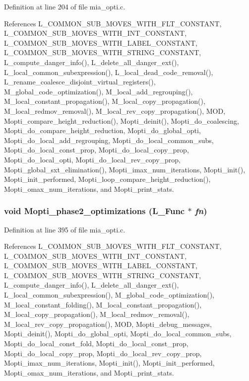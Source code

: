 Definition at line 204 of file mia\_\-opti.c.

References L\_\-COMMON\_\-SUB\_\-MOVES\_\-WITH\_\-FLT\_\-CONSTANT, L\_\-COMMON\_\-SUB\_\-MOVES\_\-WITH\_\-INT\_\-CONSTANT, L\_\-COMMON\_\-SUB\_\-MOVES\_\-WITH\_\-LABEL\_\-CONSTANT, L\_\-COMMON\_\-SUB\_\-MOVES\_\-WITH\_\-STRING\_\-CONSTANT, L\_\-compute\_\-danger\_\-info(), L\_\-delete\_\-all\_\-danger\_\-ext(), L\_\-local\_\-common\_\-subexpression(), L\_\-local\_\-dead\_\-code\_\-removal(), L\_\-rename\_\-coalesce\_\-disjoint\_\-virtual\_\-registers(), M\_\-global\_\-code\_\-optimization(), M\_\-local\_\-add\_\-regrouping(), M\_\-local\_\-constant\_\-propagation(), M\_\-local\_\-copy\_\-propagation(), M\_\-local\_\-redmov\_\-removal(), M\_\-local\_\-rev\_\-copy\_\-propagation(), MOD, Mopti\_\-compare\_\-height\_\-reduction(), Mopti\_\-deinit(), Mopti\_\-do\_\-coalescing, Mopti\_\-do\_\-compare\_\-height\_\-reduction, Mopti\_\-do\_\-global\_\-opti, Mopti\_\-do\_\-local\_\-add\_\-regrouping, Mopti\_\-do\_\-local\_\-common\_\-subs, Mopti\_\-do\_\-local\_\-const\_\-prop, Mopti\_\-do\_\-local\_\-copy\_\-prop, Mopti\_\-do\_\-local\_\-opti, Mopti\_\-do\_\-local\_\-rev\_\-copy\_\-prop, Mopti\_\-global\_\-sxt\_\-elimination(), Mopti\_\-imax\_\-num\_\-iterations, Mopti\_\-init(), Mopti\_\-init\_\-performed, Mopti\_\-loop\_\-compare\_\-height\_\-reduction(), Mopti\_\-omax\_\-num\_\-iterations, and Mopti\_\-print\_\-stats.
\subsubsection{\setlength{\rightskip}{0pt plus 5cm}void Mopti\_\-phase2\_\-optimizations (L\_\-Func $\ast$ {\em fn})}\label{mia__opti_8c_858bb385579a19e2bd869f96a17e52ee}




Definition at line 395 of file mia\_\-opti.c.

References L\_\-COMMON\_\-SUB\_\-MOVES\_\-WITH\_\-FLT\_\-CONSTANT, L\_\-COMMON\_\-SUB\_\-MOVES\_\-WITH\_\-INT\_\-CONSTANT, L\_\-COMMON\_\-SUB\_\-MOVES\_\-WITH\_\-LABEL\_\-CONSTANT, L\_\-COMMON\_\-SUB\_\-MOVES\_\-WITH\_\-STRING\_\-CONSTANT, L\_\-compute\_\-danger\_\-info(), L\_\-delete\_\-all\_\-danger\_\-ext(), L\_\-local\_\-common\_\-subexpression(), M\_\-global\_\-code\_\-optimization(), M\_\-local\_\-constant\_\-folding(), M\_\-local\_\-constant\_\-propagation(), M\_\-local\_\-copy\_\-propagation(), M\_\-local\_\-redmov\_\-removal(), M\_\-local\_\-rev\_\-copy\_\-propagation(), MOD, Mopti\_\-debug\_\-messages, Mopti\_\-deinit(), Mopti\_\-do\_\-global\_\-opti, Mopti\_\-do\_\-local\_\-common\_\-subs, Mopti\_\-do\_\-local\_\-const\_\-fold, Mopti\_\-do\_\-local\_\-const\_\-prop, Mopti\_\-do\_\-local\_\-copy\_\-prop, Mopti\_\-do\_\-local\_\-rev\_\-copy\_\-prop, Mopti\_\-imax\_\-num\_\-iterations, Mopti\_\-init(), Mopti\_\-init\_\-performed, Mopti\_\-omax\_\-num\_\-iterations, and Mopti\_\-print\_\-stats.
